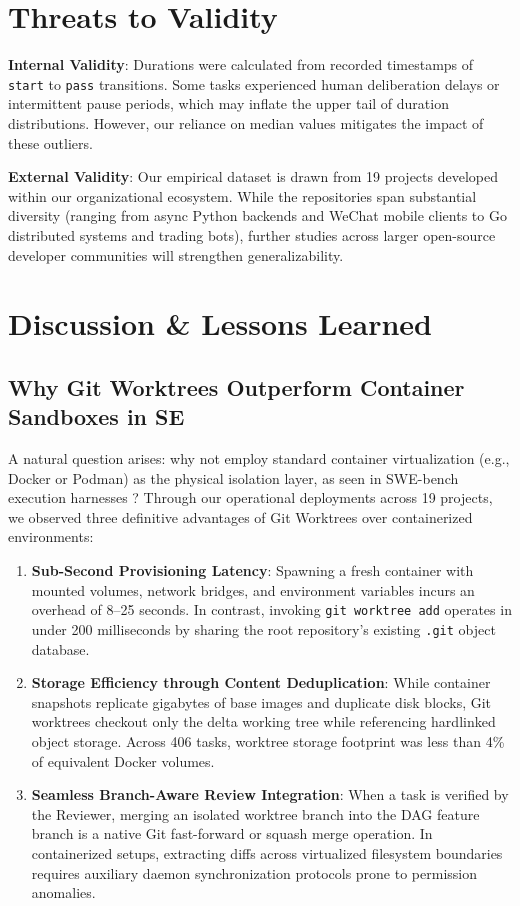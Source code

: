 \documentclass[conference]{IEEEtran}
\begin{document}
\section{Threats to Validity}
\label{sec:threats}

\textbf{Internal Validity}: Durations were calculated from recorded timestamps of \texttt{start} to \texttt{pass} transitions. Some tasks experienced human deliberation delays or intermittent pause periods, which may inflate the upper tail of duration distributions. However, our reliance on median values mitigates the impact of these outliers.

\textbf{External Validity}: Our empirical dataset is drawn from 19 projects developed within our organizational ecosystem. While the repositories span substantial diversity (ranging from async Python backends and WeChat mobile clients to Go distributed systems and trading bots), further studies across larger open-source developer communities will strengthen generalizability.

\section{Discussion \& Lessons Learned}
\label{sec:discussion}

\subsection{Why Git Worktrees Outperform Container Sandboxes in SE}
A natural question arises: why not employ standard container virtualization (e.g., Docker or Podman) as the physical isolation layer, as seen in SWE-bench execution harnesses \cite{jimenez2023swebench}? Through our operational deployments across 19 projects, we observed three definitive advantages of Git Worktrees over containerized environments:
\begin{enumerate}
    \item \textbf{Sub-Second Provisioning Latency}: Spawning a fresh container with mounted volumes, network bridges, and environment variables incurs an overhead of 8--25 seconds. In contrast, invoking \texttt{git worktree add} operates in under 200 milliseconds by sharing the root repository's existing \texttt{.git} object database.
    \item \textbf{Storage Efficiency through Content Deduplication}: While container snapshots replicate gigabytes of base images and duplicate disk blocks, Git worktrees checkout only the delta working tree while referencing hardlinked object storage. Across 406 tasks, worktree storage footprint was less than 4\% of equivalent Docker volumes.
    \item \textbf{Seamless Branch-Aware Review Integration}: When a task is verified by the Reviewer, merging an isolated worktree branch into the DAG feature branch is a native Git fast-forward or squash merge operation. In containerized setups, extracting diffs across virtualized filesystem boundaries requires auxiliary daemon synchronization protocols prone to permission anomalies.
\end{enumerate}
\end{document}
